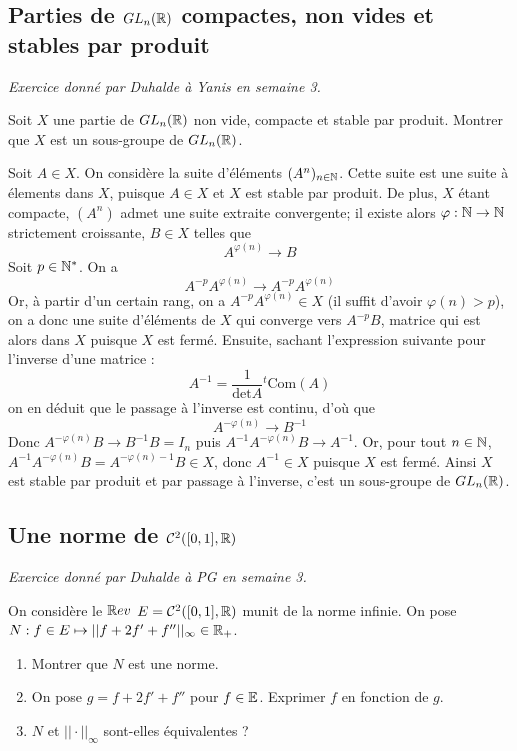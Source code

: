 \subsection{Parties de $GL_n(\mathbb{R})$ compactes, non vides et stables par produit}
\textit{Exercice donné par Duhalde à Yanis en semaine 3.}
\begin{exo}
Soit $X$ une partie de $GL_n(\mathbb{R})$ non vide, compacte et stable par produit. Montrer que $X$ est un sous-groupe de $GL_n(\mathbb{R})$.
\end{exo}
\begin{sol}
Soit $A\in X$. On considère la suite d'éléments $(A^n)_{n\in\mathbb{N}}$. Cette suite est une suite à élements dans $X$, puisque $A\in X$ et $X$ est stable par produit. De plus, $X$ étant compacte, $(A^n)$ admet une suite extraite convergente; il existe alors $\varphi : \mathbb{N}\to\mathbb{N}$ strictement croissante, $B\in X$ telles que \[A^{\varphi(n)}\longrightarrow B\]
Soit $p\in\mathbb{N}^*$. On a \[A^{-p}A^{\varphi(n)}\longrightarrow A^{-p}A^{\varphi(n)}\]
Or, à partir d'un certain rang, on a $A^{-p}A^{\varphi(n)}\in X$ (il suffit d'avoir $\varphi(n)>p$), on a donc une suite d'éléments de $X$ qui converge vers $A^{-p}B$, matrice qui est alors dans $X$ puisque $X$ est fermé. Ensuite, sachant l'expression suivante pour l'inverse d'une matrice : \[A^{-1}=\frac1{\text{det}A}{}^t\text{Com}(A)\]
on en déduit que le passage à l'inverse est continu, d'où que \[A^{-\varphi(n)}\longrightarrow B^{-1}\]
Donc $A^{-\varphi(n)}B\longrightarrow B^{-1}B=I_n$ puis $A^{-1}A^{-\varphi(n)}B\longrightarrow A^{-1}$. Or, pour tout $n\in\mathbb{N}$, $A^{-1}A^{-\varphi(n)}B=A^{-\varphi(n)-1}B\in X$, donc $A^{-1}\in X$ puisque $X$ est fermé. Ainsi $X$ est stable par produit et par passage à l'inverse, c'est un sous-groupe de $GL_n(\mathbb{R})$.
\end{sol}

\subsection{Une norme de $\mathcal C^2([0,1],\mathbb{R})$}
\textit{Exercice donné par Duhalde à PG en semaine 3.}
\begin{exo}
On considère le $\mathbb{R} ev$ $E=\mathcal C^2([0,1],\mathbb{R})$ munit de la norme infinie. On pose $N:f\in E\mapsto ||f+2f'+f''||_{\infty}\in\mathbb{R}_+$. 
\begin{enumerate}
	\item Montrer que $N$ est une norme. 
	\item On pose $g=f+2f'+f''$ pour $f\in\mathbb{E}$. Exprimer $f$ en fonction de $g$. 
	\item $N$ et $||\cdot||_{\infty}$ sont-elles équivalentes ?
\end{enumerate}
\end{exo}
\begin{sol}
[À rédiger]
\end{sol}

